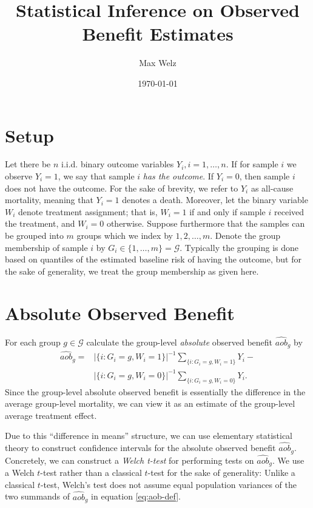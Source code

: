 \documentclass{article}
\title{Statistical Inference on Observed Benefit Estimates}
\author{Max Welz}
\date{\today}
\begin{document}
\maketitle

\section{Setup}
Let there be $n$ i.i.d. binary outcome variables $Y_i, i=1,\dots,n$. If for sample $i$ we observe $Y_i=1$, we say that sample $i$ \textit{has the outcome}. If $Y_i=0$, then sample $i$ does not have the outcome. For the sake of brevity, we refer to $Y_i$ as all-cause mortality, meaning that $Y_i = 1$ denotes a death. Moreover, let the binary variable $W_i$ denote treatment assignment; that is, $W_i = 1$ if and only if sample $i$ received the treatment, and $W_i = 0$ otherwise. Suppose furthermore that the samples can be grouped into $m$ groups which we index by $1,2,\dots,m$. Denote the group membership of sample $i$ by $G_i \in \{1,\dots,m\} = \mathcal{G}$. Typically the grouping is done based on quantiles of the estimated baseline risk of having the outcome, but for the sake of generality, we treat the group membership as given here.

\section{Absolute Observed Benefit}
For each group $g \in \mathcal{G}$ calculate the group-level \textit{absolute} observed benefit $\widehat{aob}_g$ by
\begin{equation}
\begin{split}
    \widehat{aob}_g = &|\{ i : G_i = g, W_i = 1\}|^{-1} \sum_{\{ i : G_i = g, W_i = 1 \}} Y_i
    - \\
    &|\{ i : G_i = g, W_i = 0\}|^{-1} \sum_{\{ i : G_i = g, W_i = 0 \}} Y_i.
\end{split}
\label{eq:aob-def}
\end{equation}
Since the group-level absolute observed benefit is essentially the difference in the average group-level mortality, we can view it as an estimate of the group-level average treatment effect.

Due to this ``difference in means'' structure, we can use elementary statistical theory to construct confidence intervals for the absolute observed benefit $\widehat{aob}_g$. Concretely, we can construct a \textit{Welch t-test} for performing tests on $\widehat{aob}_g$. We use a Welch $t$-test rather than a classical $t$-test for the sake of generality: Unlike a classical $t$-test, Welch's test does not assume equal population variances of the two summands of $\widehat{aob}_g$ in equation \eqref{eq:aob-def}.
\end{document}
